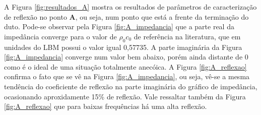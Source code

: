 
\newcommand\scalexA{0.8}
\newcommand\scaleyA{0.8}
\newcommand\scalex{1}
\newcommand\scaley{1}
\newcommand\scaleA{0.5}

\newpage

A Figura \ref{fig:resultados_A} mostra os resultados de parâmetros de caracterização de reflexão no ponto \textbf{A}, ou seja, num ponto que está a frente da terminação do duto. Pode-se observar pela Figura \ref{fig:A_impedancia} que a parte real da impedância converge para o valor de $\rho_{0} c_{0}$ de referência na literatura, que em unidades do LBM possui o valor igual 0,57735. A parte imaginária da Figura \ref{fig:A_impedancia} converge num valor bem abaixo, porém ainda distante de 0 como é o ideal de uma situação totalmente anecóica. A Figura \ref{fig:A_reflexao} confirma o fato que se vê na Figura \ref{fig:A_impedancia}, ou seja, vê-se a mesma tendência do coeficiente de reflexão na parte imaginária do gráfico de impedância, ocasionando aproxidamente 15\% de reflexão. Vale ressaltar também da Figura \ref{fig:A_reflexao} que para baixas frequências há uma alta reflexão. 

